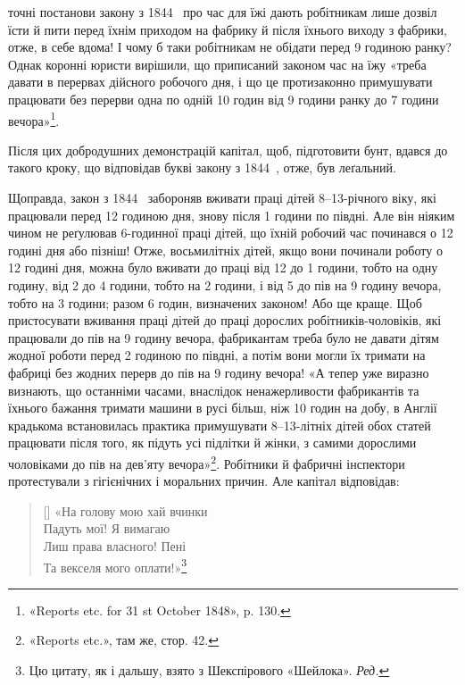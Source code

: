 \parcont{}  %
точні постанови закону з 1844~ про час для їжі дають робітникам
лише дозвіл їсти й пити перед їхнім приходом на фабрику
й після їхнього виходу з фабрики, отже, в себе вдома! І чому б
таки робітникам не обідати перед 9 годиною ранку? Однак коронні
юристи вирішили, що приписаний законом час на їжу «треба
давати в перервах дійсного робочого дня, і що це протизаконно
примушувати працювати без перерви одна по одній 10 годин
від 9 години ранку до 7 години вечора»\footnote{
«Reports etc. for 31 st October 1848», p. 130.
}.

Після цих добродушних демонстрацій капітал, щоб, підготовити
бунт, вдався до такого кроку, що відповідав букві закону
з 1844~, отже, був леґальний.

Щоправда, закон з 1844~ забороняв вживати праці дітей 8--13-річного
віку, які працювали перед 12 годиною дня, знову після
1 години по півдні. Але він ніяким чином не реґулював 6-годинної
праці дітей, що їхній робочий час починався о 12 годині
дня або пізніш! Отже, восьмилітніх дітей, якщо вони починали
роботу о 12 годині дня, можна було вживати до праці від 12 до
1 години, тобто на одну годину, від 2 до 4 години, тобто на 2 години,
і від 5 до пів на 9 годину вечора, тобто на 3 години; разом
6 годин, визначених законом! Або ще краще. Щоб пристосувати
вживання праці дітей до праці дорослих робітників-чоловіків, які
працювали до пів на 9 годину вечора, фабрикантам треба було не
давати дітям жодної роботи перед 2 годиною по півдні, а потім вони
могли їх тримати на фабриці без жодних перерв до пів на 9 годину
вечора! «А тепер уже виразно визнають, що останніми часами,
внаслідок ненажерливости фабрикантів та їхнього бажання тримати
машини в русі більш, ніж 10 годин на добу, в Англії крадькома
встановилась практика примушувати 8--13-літніх дітей
обох статей працювати після того, як підуть усі підлітки й жінки,
з самими дорослими чоловіками до пів на дев’яту вечора»\footnote{
«Reports etc.», там же, стор. 42.
}.
Робітники й фабричні інспектори протестували з гігієнічних і
моральних причин. Але капітал відповідав:

\settowidth{\versewidth}{«На голову мою хай вчинки}
\begin{verse}[\versewidth]
«На голову мою хай вчинки \\
Падуть мої! Я вимагаю \\
Лиш права власного! Пені \\
Та векселя мого оплати!»\footnote*{
Цю цитату, як і дальшу, взято з Шекспірового «Шейлока». \emph{Ред.}
}
\end{verse}

